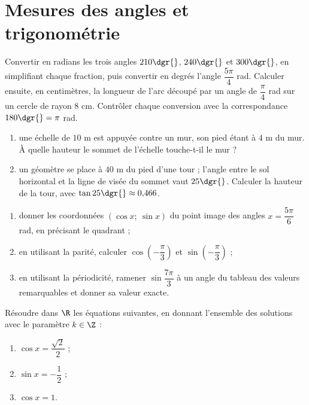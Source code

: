 \clearpage
\chapter{Mesures des angles et trigonométrie}

\begin{exercice}
Convertir en radians les trois angles $210\dgr{}$, $240\dgr{}$ et $300\dgr{}$, en simplifiant chaque fraction, puis convertir en degrés l'angle $\dfrac{5\pi}{4}$ rad. Calculer ensuite, en centimètres, la longueur de l'arc découpé par un angle de $\dfrac{\pi}{4}$ rad sur un cercle de rayon $8$ cm. Contrôler chaque conversion avec la correspondance $180\dgr{} = \pi$ rad.
\end{exercice}

\begin{exercice}
\begin{enumerate}
\item une échelle de $10$ m est appuyée contre un mur, son pied étant à $4$ m du mur. À quelle hauteur le sommet de l'échelle touche-t-il le mur ?
\item un géomètre se place à $40$ m du pied d'une tour ; l'angle entre le sol horizontal et la ligne de visée du sommet vaut $25\dgr{}$. Calculer la hauteur de la tour, avec $\tan 25\dgr{} \approx 0{,}466$.
\end{enumerate}
\end{exercice}

\begin{exercice}
\begin{enumerate}
\item donner les coordonnées $(\cos x;\ \sin x)$ du point image des angles $x = \dfrac{5\pi}{6}$ rad, en précisant le quadrant ;
\item en utilisant la parité, calculer $\cos(-\dfrac{\pi}{3})$ et $\sin(-\dfrac{\pi}{3})$ ;
\item en utilisant la périodicité, ramener $\sin\dfrac{7\pi}{3}$ à un angle du tableau des valeurs remarquables et donner sa valeur exacte.
\end{enumerate}
\end{exercice}

\begin{exercice}
Résoudre dans $\R$ les équations suivantes, en donnant l'ensemble des solutions avec le paramètre $k \in \Z$ :
\begin{enumerate}
\item $\cos x = \dfrac{\sqrt{2}}{2}$ ;
\item $\sin x = -\dfrac{1}{2}$ ;
\item $\cos x = 1$.
\end{enumerate}
\end{exercice}
